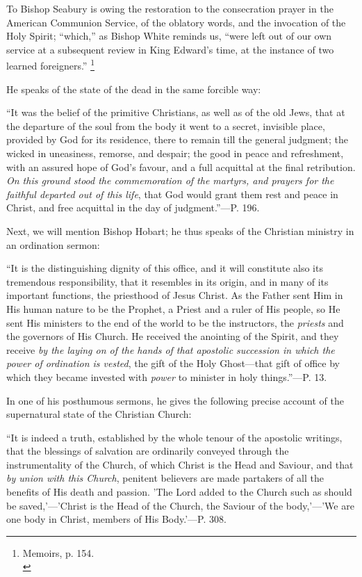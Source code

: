 To Bishop Seabury is owing the restoration to the
consecration prayer in the American Communion Service, of the oblatory
words, and the invocation of the Holy Spirit; ``which,'' as Bishop White
reminds us, ``were left out of our own service at a subsequent review
in King Edward's time, at the instance of two learned foreigners.'' \footnote{Memoirs, p. 154.\textbf{}\\}

He speaks of the state of the dead in the same
forcible way:

``It
was the belief of the primitive Christians, as well as of the old
Jews, that at the departure of the soul from the body it went to a
secret, invisible place, provided by God for its residence, there to
remain till the general judgment; the wicked in uneasiness, remorse,
and despair; the good in peace and refreshment, with an assured hope
of God's favour, and a full acquittal at the final retribution. \emph{On
this ground stood the commemoration of the martyrs, and prayers for
the faithful departed out of this life}, that God would grant them
rest and peace in Christ, and free acquittal in the day of judgment.''—P.
196.

Next, we will mention Bishop Hobart; he thus
speaks of the Christian ministry in an ordination sermon:

``It
is the distinguishing dignity of this office, and it will constitute
also its tremendous responsibility, that it resembles in its origin,
and in many of its important functions, the priesthood of Jesus
Christ. As the Father sent Him in His human nature to be the Prophet,
a Priest and a ruler of His people, so He sent His ministers to the
end of the world to be the instructors, the \emph{priests} and the
governors of His Church. He received the anointing of the Spirit, and
they receive \emph{by the laying on of the hands of that apostolic
succession in which the power of ordination is vested}, the gift of
the Holy Ghost—that gift of office by which they became invested
with \emph{power} to minister in holy things.''—P. 13.

In one of his posthumous sermons, he gives the
following precise account of the supernatural state of the Christian
Church:

``It
is indeed a truth, established by the whole tenour of the apostolic
writings, that the blessings of salvation are ordinarily conveyed
through the instrumentality of the Church, of which Christ is the Head
and Saviour, and that \emph{by union with this Church}, penitent
believers are made partakers of all the benefits of His death and
passion. 'The Lord added to the Church such as should be
saved,'—'Christ is the Head of the Church, the Saviour of the
body,'—'We are one body in Christ, members of His Body.'—P. 308.

